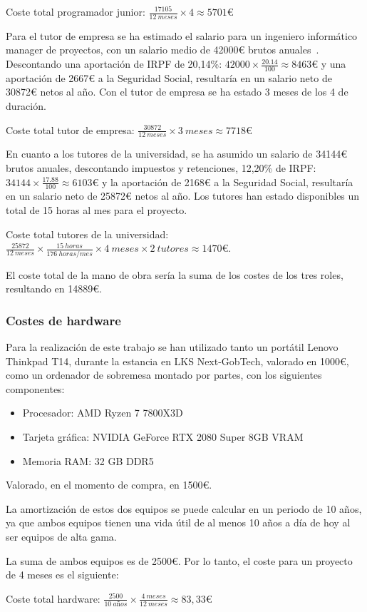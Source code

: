 \begin{center}
    Coste total programador junior: \(\frac{17105}{12~meses} \times 4 \approx 5701\)€
\end{center}
\newpage
Para el tutor de empresa se ha estimado el salario para un ingeniero informático manager de proyectos, con un salario medio de 42000€ brutos anuales~\cite{glassdoor}. Descontando una aportación de IRPF de 20,14\%: \(42000 \times \frac{20.14}{100} \approx 8463\)€ y una aportación de 2667€ a la Seguridad Social, resultaría en un salario neto de 30872€ netos al año. Con el tutor de empresa se ha estado 3 meses de los 4 de duración.

\begin{center}
    Coste total tutor de empresa: \(\frac{30872}{12~meses} \times {3~meses} \approx 7718\)€
\end{center}

En cuanto a los tutores de la universidad, se ha asumido un salario de 34144€ brutos anuales, descontando impuestos y retenciones, 12,20\% de IRPF: \(34144 \times \frac{17.88}{100} \approx 6103\)€ y la aportación de 2168€ a la Seguridad Social, resultaría en un salario neto de 25872€ netos al año. Los tutores han estado disponibles un total de 15 horas al mes para el proyecto.
\begin{center}
    Coste total tutores de la universidad: \(\frac{25872}{12~meses} \times \frac{15~horas}{176~horas/mes} \times {4~meses} \times {2~tutores} \approx 1470\)€.
\end{center}

El coste total de la mano de obra sería la suma de los costes de los tres roles, resultando en 14889€.

\subsubsection{Costes de hardware}
Para la realización de este trabajo se han utilizado tanto un portátil Lenovo Thinkpad T14, durante la estancia en LKS Next-GobTech, valorado en 1000€, como un ordenador de sobremesa montado por partes, con los siguientes componentes:

\begin{itemize}
    \item Procesador: AMD Ryzen 7 7800X3D
    \item Tarjeta gráfica: NVIDIA GeForce RTX 2080 Super 8GB VRAM
    \item Memoria RAM: 32 GB DDR5
\end{itemize}

Valorado, en el momento de compra, en 1500€.

La amortización de estos dos equipos se puede calcular en un periodo de 10 años, ya que ambos equipos tienen una vida útil de al menos 10 años a día de hoy al ser equipos de alta gama.
\newpage

La suma de ambos equipos es de 2500€. Por lo tanto, el coste para un proyecto de 4 meses es el siguiente:
\begin{center}
    Coste total hardware: \(\frac{2500}{10~años} \times \frac{4~meses}{12~meses} \approx 83,33\)€
\end{center}
